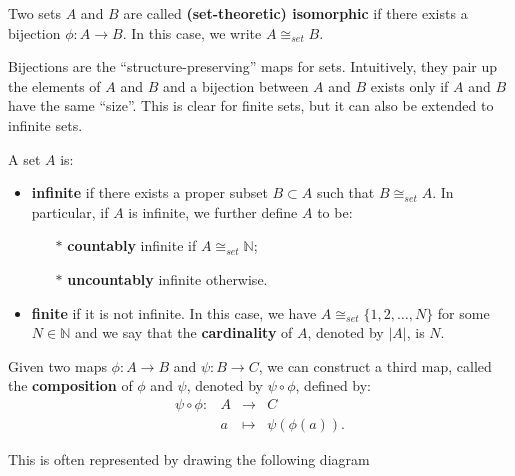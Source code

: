 \documentclass[root.tex]{subfiles}
\begin{document}
\begin{mydef}
  Two sets $A$ and $B$ are called \textbf{(set-theoretic) isomorphic} if there exists a bijection $\phi : A \to B$. In this case, we write $A \cong_{set} B$.
\end{mydef}

Bijections are the ``structure-preserving'' maps for sets. Intuitively, they pair up the elements of $A$ and $B$ and a bijection between $A$ and $B$ exists only if $A$ and $B$ have the same ``size''. This is clear for finite sets, but it can also be extended to infinite sets.\\


\begin{mydef}
A set $A$ is:
\begin{itemize}
  \item \textbf{infinite} if there exists a proper subset $B\subset A$ such that $B \cong_{set} A$. In particular, if $A$ is infinite, we further define $A$ to be:
\begin{itemize}
  \item[$*$] \textbf{countably} infinite if $A \cong_{set} \mathbb{N}$;
\item[$*$] \textbf{uncountably} infinite otherwise.
\end{itemize}
\item \textbf{finite} if it is not infinite. In this case, we have $A \cong_{set} \{1,2,\ldots,N\}$ for some $N \in \mathbb{N}$ and we say that the \textbf{cardinality} of $A$, denoted by $|A|$, is $N$.
\end{itemize}
\end{mydef}

Given two maps $\phi : A \to B$ and $\psi : B \to C$, we can construct a third map, called the \textbf{composition} of $\phi$ and $\psi$, denoted by $\psi \circ \phi$, defined by:
\begin{equation}\begin{aligned}
\psi \circ \phi : & A & \to & C\\
& a & \mapsto & \psi(\phi(a)).
\end{aligned}\end{equation}

This is often represented by drawing the following diagram
\begin{figure}[hbtp]
  \centering
{}
\end{figure}
\end{document}
